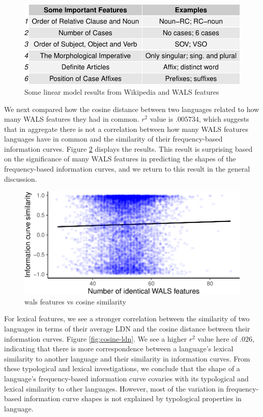 \documentclass[man,floatsintext]{apa6}
\begin{document}
\begin{figure}
\centering
\includegraphics{figs/linear-models-1.pdf}
\caption{\label{fig:linear-models}Some linear model results from Wikipedia and WALS features}
\end{figure}

We next compared how the cosine distance between two languages related to how many WALS features they had in common. \(r^2\) value is \(.005734\), which suggests that in aggregate there is not a correlation between how many WALS features languages have in common and the similarity of their frequency-based information curves. Figure \ref{fig:cosine-wals} displays the results. This result is surprising based on the significance of many WALS features in predicting the shapes of the frequency-based information curves, and we return to this result in the general discussion.

\begin{figure}
\centering
\includegraphics{figs/cosine-wals-1.pdf}
\caption{\label{fig:cosine-wals}wals features vs cosine similarity}
\end{figure}

For lexical features, we see a stronger correlation between the similarity of two languages in terms of their average LDN and the cosine distance between their information curves. Figure \ref{fig:cosine-ldn}. We see a higher \(r^2\) value here of \(.026\), indicating that there is more correspondence between a language's lexical similarity to another language and their similarity in information curves. From these typological and lexical investigations, we conclude that the shape of a language's frequency-based information curve covaries with its typological and lexical similarity to other languages. However, most of the variation in frequency-based information curve shapes is not explained by typological properties in language.
\end{document}
